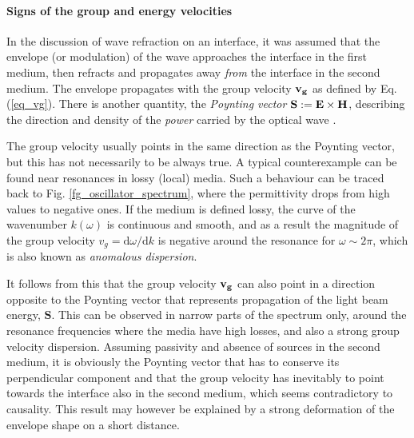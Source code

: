 \paragraph{Signs of the group and energy velocities}  %
In the discussion of wave refraction on an interface, it was assumed that the envelope (or modulation) of the wave approaches the interface in the first medium, then refracts and propagates away \textit{from} the interface in the second medium. The envelope propagates with the group velocity ${\mathbf{v_g}}$ as defined by Eq. (\ref{eq_vg}). There is another quantity, the \textit{Poynting vector} $\mathbf{S} := \mathbf{E}\times\mathbf{H}$, describing the direction and density of the \textit{power} carried by the optical wave \cite[p. 16]{klingshirn2007semiconductor}. 

The group velocity usually points in the same direction as the Poynting vector, but this has not necessarily to be always true. A typical counterexample can be found near resonances in lossy (local) media. Such a behaviour can be traced back to Fig. \ref{fg_oscillator_spectrum}, where the permittivity drops from high values to negative ones. If the medium is defined lossy, the curve of the wavenumber $k(\omega)$ is continuous and smooth, and as a result the magnitude of the group velocity $v_g = \mathrm{d}\omega / \mathrm{d}k$ is negative around the resonance for $\omega \sim 2\pi$, %
which is also known as \textit{anomalous dispersion}. 

It follows from this that the group velocity ${\mathbf{v_g}}$ can also point in a direction opposite to the Poynting vector that represents propagation of the light beam energy, $\mathbf{S}$. 
This can be observed in narrow parts of the spectrum only, around the resonance frequencies where the media have high losses, and also a strong group velocity dispersion.
Assuming passivity and absence of sources in the second medium, it is obviously the Poynting vector that has to conserve its perpendicular component and that the group velocity has inevitably to point towards the interface also in the second medium, which seems contradictory to causality.
This result 
may however be explained by a strong deformation of the envelope shape on a short distance. %

